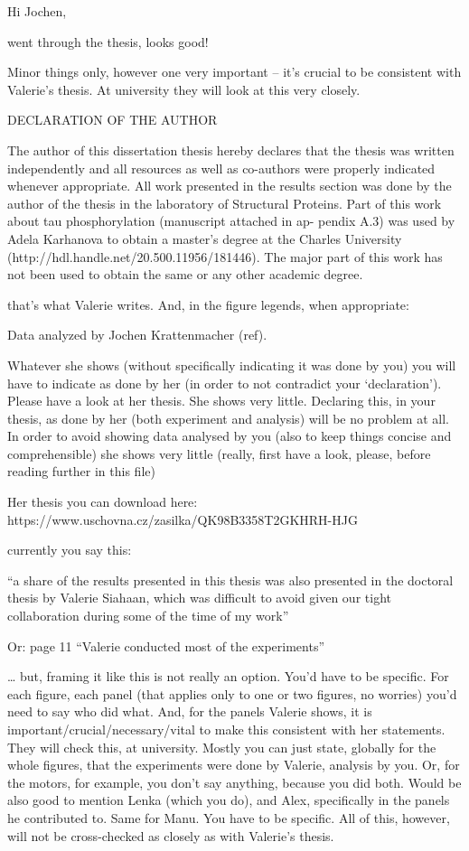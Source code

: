 Hi Jochen, 

went through the thesis, looks good!

Minor things only, however one very important – it’s crucial to be consistent with Valerie’s thesis. At university they will look at this very closely.

DECLARATION OF THE AUTHOR 

The author of this dissertation thesis hereby declares that the thesis was written independently and all resources as well as co-authors were properly indicated whenever appropriate. All work presented in the results section was done by the author of the thesis in the laboratory of Structural Proteins. Part of this work about tau phosphorylation (manuscript attached in ap- pendix A.3) was used by Adela Karhanova to obtain a master’s degree at the Charles University (http://hdl.handle.net/20.500.11956/181446). The major part of this work has not been used to obtain the same or any other academic degree. 

that’s what Valerie writes. And, in the figure legends, when appropriate: 

Data analyzed by Jochen Krattenmacher (ref). 

Whatever she shows (without specifically indicating it was done by you) you will have to indicate as done by her (in order to not contradict your ‘declaration’). Please have a look at her thesis. She shows very little. Declaring this, in your thesis, as done by her (both experiment and analysis) will be no problem at all. In order to avoid showing data analysed by you (also to keep things concise and comprehensible) she shows very little (really, first have a look, please, before reading further in this file)

Her thesis you can download here: 
https://www.uschovna.cz/zasilka/QK98B3358T2GKHRH-HJG

currently you say this:

“a share of the results presented in this thesis was also presented in the doctoral thesis by Valerie Siahaan, which was difficult to avoid given our tight collaboration during some of the time of my work” 

Or: page 11 “Valerie conducted most of the experiments”

… but, framing it like this is not really an option. You’d have to be specific. For each figure, each panel (that applies only to one or two figures, no worries) you’d need to say who did what. And, for the panels Valerie shows, it is important/crucial/necessary/vital to make this consistent with her statements. They will check this, at university. Mostly you can just state, globally for the whole figures, that the experiments were done by Valerie, analysis by you. Or, for the motors, for example, you don’t say anything, because you did both. Would be also good to mention Lenka (which you do), and Alex, specifically in the panels he contributed to. Same for Manu. You have to be specific. All of this, however, will not be cross-checked as closely as with Valerie’s thesis.

